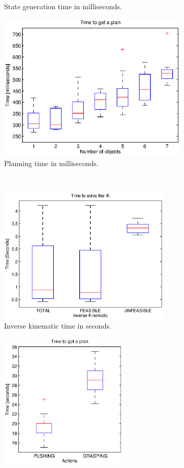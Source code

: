 \begin{figure}[tb]
\begin{subfigure}[t]{0.45\textwidth}
\caption{State generation time in milliseconds.}
\label{fig:time_predicates}
\end{subfigure}
\begin{subfigure}[t]{0.45\textwidth}
\centering
\includegraphics[width=\textwidth]{Img/experiments/exp_good/data/planning.eps}
\caption{Planning time in milliseconds.}\label{fig:time_plan}
\end{subfigure}
\\
\begin{subfigure}[t]{0.45\textwidth}
\centering
\includegraphics[height=6.5cm]{Img/experiments/exp_good/data/ik.eps}
\caption{Inverse kinematic time in seconds.}
\end{subfigure}
\begin{subfigure}[t]{0.45\textwidth}
\centering
\includegraphics[height=6.5cm]{Img/experiments/exp_good/data/actions.eps}

\end{subfigure}
\end{figure}
